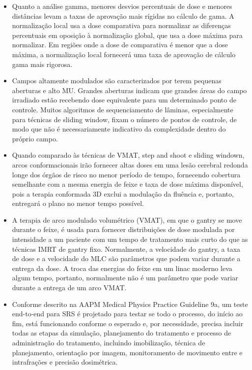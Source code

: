 \documentclass[11pt,a4paper]{article}
\newcounter{exemplo}
\begin{document}
\begin{exemplo}
\begin{itemize}
        \item Quanto a análise gamma, menores desvios percentuais de dose e menores distâncias levam a taxas de aprovação mais rígidas no cálculo de gama. A normalização local usa a dose comparativa para normalizar as diferenças percentuais em oposição à normalização global, que usa a dose máxima para normalizar. Em regiões onde a dose de comparativa é menor que a dose máxima, a normalização local fornecerá uma taxa de aprovação de cálculo gama mais rigorosa.
        
        \item Campos altamente modulados são caracterizados por terem pequenas aberturas e alto MU. Grandes aberturas indicam que grandes áreas do campo irradiado estão recebendo dose equivalente para um determinado ponto de controle. Muitos algoritmos de sequenciamento de lâminas, especialmente para técnicas de sliding window, fixam o número de pontos de controle, de modo que não é necessariamente indicativo da complexidade dentro do próprio campo.
        
        \item Quando comparado às técnicas de VMAT, step and shoot e sliding windown, arcos conformacionais irão fornecer altas doses em uma lesão cerebral redonda longe dos órgãos de risco no menor período de tempo, fornecendo cobertura semelhante com a mesma energia de feixe e taxa de dose máxima disponível, pois a terapia conformada 3D exclui a modulação da fluência e, portanto, entregará o plano no menor tempo possível.
        
        \item   A terapia de arco modulado volumétrico (VMAT), em que o gantry se move durante o feixe, é usada para fornecer distribuições de dose modulada por intensidade a um paciente com um tempo de tratamento mais curto do que as técnicas IMRT de gantry fixo. Normalmente, a velocidade do gantry, a taxa de dose e a velocidade do MLC são parâmetros que podem variar durante a entrega da dose. A troca das energias do feixe em um linac moderno leva algum tempo, portanto, normalmente não é um parâmetro que pode variar durante a entrega de um arco VMAT.
        
        
        
        \item Conforme descrito na AAPM Medical Physics Practice Guideline 9a, um teste end-to-end para SRS é projetado para testar se todo o processo, do início ao fim, está funcionando conforme o esperado e, por necessidade, precisa incluir todas as etapas da simulação, planejamento do tratamento e processo de administração do tratamento, incluindo imobilização, técnica de planejamento, orientação por imagem, monitoramento de movimento entre e intrafrações e precisão dosimétrica.
        

\end{itemize}
\end{exemplo}
\end{document}
